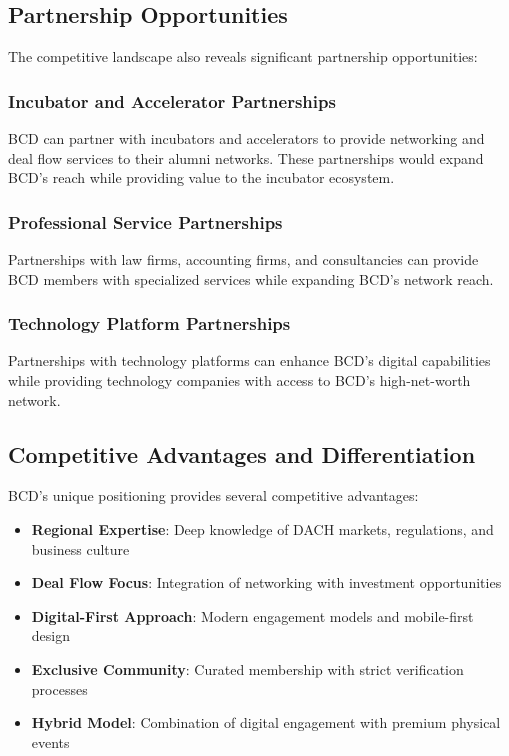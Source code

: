 \subsection{Partnership Opportunities}

The competitive landscape also reveals significant partnership opportunities:

\subsubsection{Incubator and Accelerator Partnerships}
BCD can partner with incubators and accelerators to provide networking and deal flow services to their alumni networks. These partnerships would expand BCD's reach while providing value to the incubator ecosystem.

\subsubsection{Professional Service Partnerships}
Partnerships with law firms, accounting firms, and consultancies can provide BCD members with specialized services while expanding BCD's network reach.

\subsubsection{Technology Platform Partnerships}
Partnerships with technology platforms can enhance BCD's digital capabilities while providing technology companies with access to BCD's high-net-worth network.

\subsection{Competitive Advantages and Differentiation}

BCD's unique positioning provides several competitive advantages:

\begin{itemize}
    \item \textbf{Regional Expertise}: Deep knowledge of DACH markets, regulations, and business culture
    \item \textbf{Deal Flow Focus}: Integration of networking with investment opportunities
    \item \textbf{Digital-First Approach}: Modern engagement models and mobile-first design
    \item \textbf{Exclusive Community}: Curated membership with strict verification processes
    \item \textbf{Hybrid Model}: Combination of digital engagement with premium physical events
\end{itemize}

